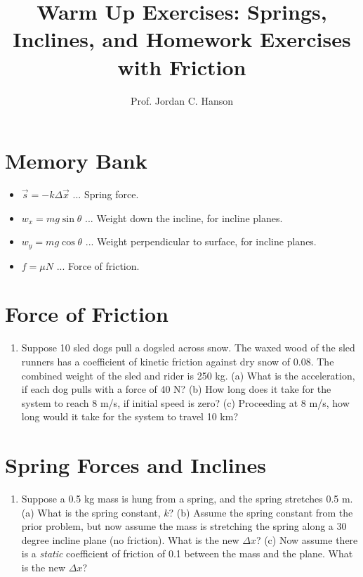 \documentclass{article}
\begin{document}
\title{Warm Up Exercises: Springs, Inclines, and Homework Exercises with Friction}
\author{Prof. Jordan C. Hanson}

\maketitle

\section{Memory Bank}

\begin{itemize}
\item $\vec{s} = - k \Delta \vec{x}$ ... Spring force.
\item $w_x = mg \sin\theta$ ... Weight down the incline, for incline planes.
\item $w_y = mg \cos\theta$ ... Weight perpendicular to surface, for incline planes.
\item $f = \mu N$ ... Force of friction.
\end{itemize}

\section{Force of Friction}
\begin{enumerate}
\item Suppose 10 sled dogs pull a dogsled across snow.  The waxed wood of the sled runners has a coefficient of kinetic friction against dry snow of 0.08.  The combined weight of the sled and rider is 250 kg. (a) What is the acceleration, if each dog pulls with a force of 40 N? (b) How long does it take for the system to reach 8 m/s, if initial speed is zero? (c) Proceeding at 8 m/s, how long would it take for the system to travel 10 km? \\ \vspace{2.5cm}
\end{enumerate}

\section{Spring Forces and Inclines}
\begin{enumerate}
\item Suppose a 0.5 kg mass is hung from a spring, and the spring stretches 0.5 m.  (a) What is the spring constant, $k$? (b) Assume the spring constant from the prior problem, but now assume the mass is stretching the spring along a 30 degree incline plane (no friction).  What is the new $\Delta x$? (c) Now assume there is a \textit{static} coefficient of friction of 0.1 between the mass and the plane.  What is the new $\Delta x$?
\end{enumerate}
\end{document}

